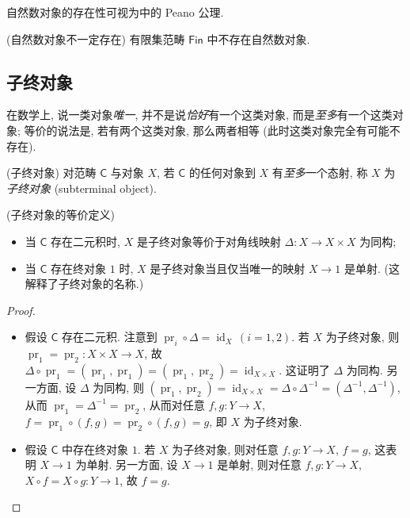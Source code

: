 \begin{remark}{}
	自然数对象的存在性可视为\topos{}中的 Peano 公理.
\end{remark}

\begin{example}
    {(自然数对象不一定存在)}
    有限集范畴 $\mathsf {Fin}$ 中不存在自然数对象.
\end{example}

\subsection{子终对象}

在数学上, 说一类对象\emph{唯一}, 并不是说\emph{恰好}有一个这类对象, 而是\emph{至多}有一个这类对象; 等价的说法是, 若有两个这类对象, 那么两者相等 (此时这类对象完全有可能不存在).

\begin{definition}
	[label={subterminal-object-definition}]
	{(子终对象)}
	对范畴 $\mathsf C$ 与对象 $X$, 若 $\mathsf C$ 的任何对象到 $X$ 有\emph{至多}一个态射, 称 $X$ 为\emph{子终对象} (subterminal object).
\end{definition}

\begin{prop}
	{(子终对象的等价定义)}
	\begin{itemize}
		\item 当 $\mathsf C$ 存在二元积时, $X$ 是子终对象等价于对角线映射 $\Delta\colon X\to X\times X$ 为同构;
		\item 当 $\mathsf C$ 存在终对象 $1$ 时, $X$ 是子终对象当且仅当唯一的映射 $X\to 1$ 是单射. (这解释了子终对象的名称.)
	\end{itemize}
\end{prop}

\begin{proof}
	~\\
	\begin{itemize}
		\item 假设 $\mathsf C$ 存在二元积. 注意到 $\operatorname{pr}_i\circ\Delta=\operatorname{id}_X\,(i=1,2)$.
		若 $X$ 为子终对象, 则
		$\operatorname{pr}_1=\operatorname{pr}_2\colon X\times X\to X$,
		故 $\Delta\circ \operatorname{pr}_1 = (\operatorname{pr}_1,\operatorname{pr}_1)= (\operatorname{pr}_1,\operatorname{pr}_2) = \operatorname{id}_{X\times X}$. 这证明了 $\Delta$ 为同构.
		另一方面, 设 $\Delta$ 为同构,
		则 $(\operatorname{pr}_1,\operatorname{pr}_2)=\operatorname{id}_{X\times X} = \Delta\circ\Delta^{-1} = (\Delta^{-1},\Delta^{-1})$, 从而 $\operatorname{pr}_1=\Delta^{-1}=\operatorname{pr}_2$,
		从而对任意 $f,g\colon Y\to X$,
		$f=\operatorname{pr}_1\circ (f,g)=\operatorname{pr}_2\circ (f,g)=g$, 即 $X$ 为子终对象.
		\item 假设 $\mathsf C$ 中存在终对象 $1$.
		若 $X$ 为子终对象, 则对任意 $f,g\colon Y\to X$, $f=g$, 这表明 $X\to 1$ 为单射.
		另一方面, 设 $X\to 1$ 是单射, 则对任意 $f,g\colon Y\to X$, $X\circ f=X\circ g\colon Y\to 1$, 故 $f=g$.
	\end{itemize}
\end{proof}

